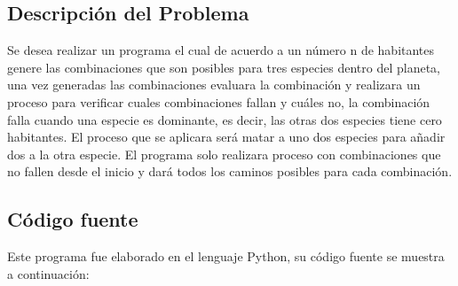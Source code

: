 \documentclass[12pt]{article}
\begin{document}
\subsection{Descripción del Problema}

Se desea realizar un programa el cual de acuerdo a un número n de habitantes genere las combinaciones que son posibles para tres especies dentro del planeta, una vez generadas las combinaciones evaluara la combinación y realizara un proceso para verificar cuales combinaciones fallan y cuáles no, la combinación falla cuando una especie es dominante, es decir, las otras dos especies tiene cero habitantes. El proceso que se aplicara será matar a uno dos especies para añadir dos a la otra especie. El programa solo realizara proceso con combinaciones que no fallen desde el inicio y dará todos los caminos posibles para cada combinación.

\subsection{Código fuente}
Este programa fue elaborado en el lenguaje Python, su código fuente se muestra a continuación:
\end{document}
